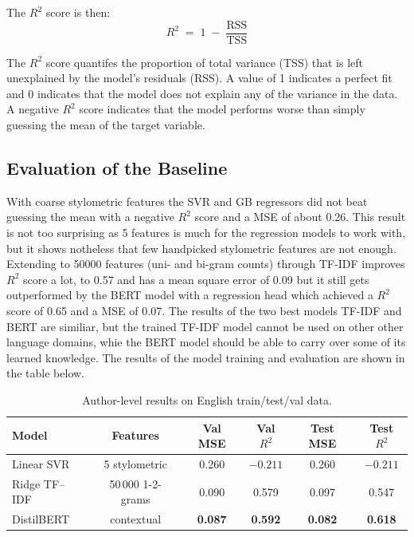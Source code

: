 \documentclass[twoside]{ctuthesis}
\theoremstyle{plain}
\theoremstyle{definition}
\theoremstyle{note}
\begin{document}
The $R^2$ score is then:
\begin{equation}
	R^{2} \;=\; 1 \;-\; \frac{\mathrm{RSS}}{\mathrm{TSS}}
\end{equation}

The $R^2$ score quantifes the proportion of total variance (TSS) that is left unexplained by the model's residuals (RSS).  A value of 1 indicates a perfect fit and 0 indicates that the model does not explain any of the variance in the data. A negative $R^2$ score indicates that the model performs worse than simply guessing the mean of the target variable.\par

\subsection{Evaluation of the Baseline}
With coarse stylometric features the SVR and GB regressors did not beat guessing the mean with a negative $R^2$ score and a MSE of about 0.26. This result is not too surprising as 5 features is much for the regression models to work with, but it shows notheless that few handpicked stylometric features are not enough. Extending to 50000 features (uni- and bi-gram counts) through TF-IDF improves $R^2$ score a lot, to 0.57 and has a mean square error of 0.09 but it still gets outperformed by the BERT model with a regression head which achieved a $R^2$ score of 0.65 and a MSE of 0.07. The results of the two best models TF-IDF and BERT are similiar, but the trained TF-IDF model cannot be used on other other language domains, whie the BERT model should be able to carry over some of its learned knowledge. The results of the model training and evaluation are shown in the table below.\par

\begin{table}[ht]
	\centering
	\caption{Author-level results on English train/test/val data.}
	\label{tab:en_author_results}
	\begin{tabular}{lccccc}
	  \hline
	  \textbf{Model} & \textbf{Features} &
	  \textbf{Val MSE} & \textbf{Val $R^{2}$} &
	  \textbf{Test MSE} & \textbf{Test $R^{2}$} \\
	  \hline
	  Linear SVR & 5 stylometric          & 0.260 & $-0.211$ & 0.260 & $-0.211$ \\
	  Ridge TF--IDF & 50\,000 1-2-grams   & 0.090 & 0.579   & 0.097 & 0.547    \\
	  DistilBERT & contextual   & \textbf{0.087} & \textbf{0.592} &
										   \textbf{0.082} & \textbf{0.618} \\
	  \hline
	\end{tabular}
\end{table}
\end{document}
